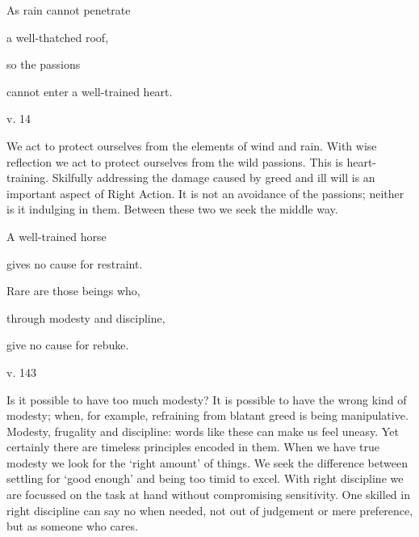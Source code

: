 \documentclass[a4paper,portrait,12pt]{article}
\begin{document}
As rain cannot penetrate


a well-thatched roof,


so the passions


cannot enter a well-trained heart.





v. 14





We act to protect ourselves from the elements of wind and rain. With wise reflection we act to protect ourselves from the wild passions. This is heart-training. Skilfully addressing the damage caused by greed and ill will is an important aspect of Right Action. It is not an avoidance of the passions; neither is it indulging in them. Between these two we seek the middle way.














A well-trained horse


gives no cause for restraint.


Rare are those beings who,


through modesty and discipline,


give no cause for rebuke.





v. 143


 


Is it possible to have too much modesty? It is possible to have the wrong kind of modesty; when, for example, refraining from blatant greed is being manipulative. Modesty, frugality and discipline: words like these can make us feel uneasy. Yet certainly there are timeless principles encoded in them. When we have true modesty we look for the `right amount' of things. We seek the difference between settling for `good enough' and being too timid to excel. With right discipline we are focussed on the task at hand without compromising sensitivity. One skilled in right discipline can say no when needed, not out of judgement or mere preference, but as someone who cares.
\end{document}
